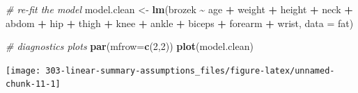 \documentclass[
]{book}
\newenvironment{Shaded}{\begin{snugshade}}{\end{snugshade}}
\newcommand{\CommentTok}[1]{\textcolor[rgb]{0.56,0.35,0.01}{\textit{#1}}}
\newcommand{\DataTypeTok}[1]{\textcolor[rgb]{0.13,0.29,0.53}{#1}}
\newcommand{\DecValTok}[1]{\textcolor[rgb]{0.00,0.00,0.81}{#1}}
\newcommand{\KeywordTok}[1]{\textcolor[rgb]{0.13,0.29,0.53}{\textbf{#1}}}
\newcommand{\NormalTok}[1]{#1}
\newcommand{\OperatorTok}[1]{\textcolor[rgb]{0.81,0.36,0.00}{\textbf{#1}}}
\newcommand{\StringTok}[1]{\textcolor[rgb]{0.31,0.60,0.02}{#1}}
\theoremstyle{definition}
\theoremstyle{definition}
\theoremstyle{definition}
\theoremstyle{remark}
\begin{document}
\begin{Shaded}
\begin{Highlighting}[]
\CommentTok{\# re{-}fit the model}
\NormalTok{model.clean \textless{}{-}}\StringTok{ }\KeywordTok{lm}\NormalTok{(brozek }\OperatorTok{\textasciitilde{}}\StringTok{ }\NormalTok{age }\OperatorTok{+}\StringTok{ }\NormalTok{weight }\OperatorTok{+}\StringTok{ }\NormalTok{height }\OperatorTok{+}\StringTok{ }\NormalTok{neck }\OperatorTok{+}\StringTok{ }\NormalTok{abdom }\OperatorTok{+}\StringTok{ }\NormalTok{hip }\OperatorTok{+}\StringTok{ }\NormalTok{thigh }\OperatorTok{+}\StringTok{ }\NormalTok{knee }\OperatorTok{+}\StringTok{ }\NormalTok{ankle }\OperatorTok{+}\StringTok{ }\NormalTok{biceps }\OperatorTok{+}\StringTok{ }\NormalTok{forearm }\OperatorTok{+}\StringTok{ }\NormalTok{wrist, }\DataTypeTok{data =}\NormalTok{ fat)}

\CommentTok{\# diagnostics plots}
\KeywordTok{par}\NormalTok{(}\DataTypeTok{mfrow=}\KeywordTok{c}\NormalTok{(}\DecValTok{2}\NormalTok{,}\DecValTok{2}\NormalTok{))}
\KeywordTok{plot}\NormalTok{(model.clean)}
\end{Highlighting}
\end{Shaded}

\begin{center}\texttt{[image: 303-linear-summary-assumptions\_files/figure-latex/unnamed-chunk-11-1]} \end{center}
\end{document}
